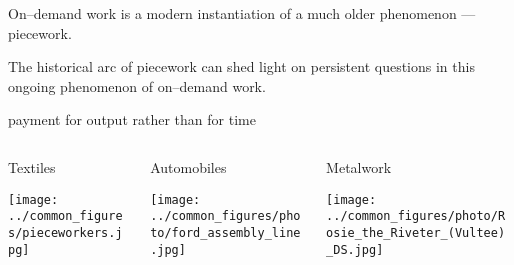 \documentclass[presentation]{subfiles}
\begin{document}
\begin{frame}[standout,label=takeaway]
  On--demand work is a modern instantiation of a much older phenomenon
  --- {piecework}.

  {\normalsize The historical arc of piecework
  can shed light on persistent questions
  in this ongoing phenomenon of on--demand work.}
\end{frame}


\begin{frame}[t]{payment for output rather than for time}
  \begin{columns}[T]
    \begin{column}{0.33\textwidth}
      \centering
      Textiles

      \vspace{0.5em}

      \texttt{[image: ../common\_figures/pieceworkers.jpg]}
    \end{column}
    \begin{column}{0.33\textwidth}
      \centering
      Automobiles

      \vspace{0.5em}

      \texttt{[image: ../common\_figures/photo/ford\_assembly\_line.jpg]}
    \end{column}
    \begin{column}{0.33\textwidth}
      \centering
      Metalwork

      \vspace{0.5em}

      \texttt{[image: ../common\_figures/photo/Rosie\_the\_Riveter\_(Vultee)\_DS.jpg]}
    \end{column}
  \end{columns}
  \vspace*{7mm}
  
\end{frame}
\end{document}
